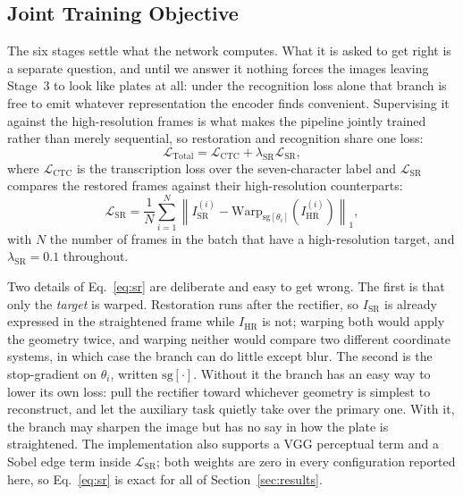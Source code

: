 \documentclass[runningheads]{llncs}
\begin{document}

\subsection{Joint Training Objective}

The six stages settle what the network computes. What it is asked to get right is a separate question, and until we answer it nothing forces the images leaving Stage~3 to look like plates at all: under the recognition loss alone that branch is free to emit whatever representation the encoder finds convenient. Supervising it against the high-resolution frames is what makes the pipeline jointly trained rather than merely sequential, so restoration and recognition share one loss:
\begin{equation}
\mathcal{L}_{\mathrm{Total}} = \mathcal{L}_{\mathrm{CTC}} + \lambda_{\mathrm{SR}}\mathcal{L}_{\mathrm{SR}},
\label{eq:total}
\end{equation}
where $\mathcal{L}_{\mathrm{CTC}}$ is the transcription loss over the seven-character label and $\mathcal{L}_{\mathrm{SR}}$ compares the restored frames against their high-resolution counterparts:
\begin{equation}
\mathcal{L}_{\mathrm{SR}} = \frac{1}{N}\sum_{i=1}^{N}
  \left\| I_{\mathrm{SR}}^{(i)} - \mathrm{Warp}_{\mathrm{sg}[\theta_i]}\!\left(I_{\mathrm{HR}}^{(i)}\right) \right\|_1,
\label{eq:sr}
\end{equation}
with $N$ the number of frames in the batch that have a high-resolution target, and $\lambda_{\mathrm{SR}} = 0.1$ throughout.

Two details of Eq.~\eqref{eq:sr} are deliberate and easy to get wrong. The first is that only the \emph{target} is warped. Restoration runs after the rectifier, so $I_{\mathrm{SR}}$ is already expressed in the straightened frame while $I_{\mathrm{HR}}$ is not; warping both would apply the geometry twice, and warping neither would compare two different coordinate systems, in which case the branch can do little except blur. The second is the stop-gradient on $\theta_i$, written $\mathrm{sg}[\cdot]$. Without it the branch has an easy way to lower its own loss: pull the rectifier toward whichever geometry is simplest to reconstruct, and let the auxiliary task quietly take over the primary one. With it, the branch may sharpen the image but has no say in how the plate is straightened. The implementation also supports a VGG perceptual term and a Sobel edge term inside $\mathcal{L}_{\mathrm{SR}}$; both weights are zero in every configuration reported here, so Eq.~\eqref{eq:sr} is exact for all of Section~\ref{sec:results}.
\end{document}
